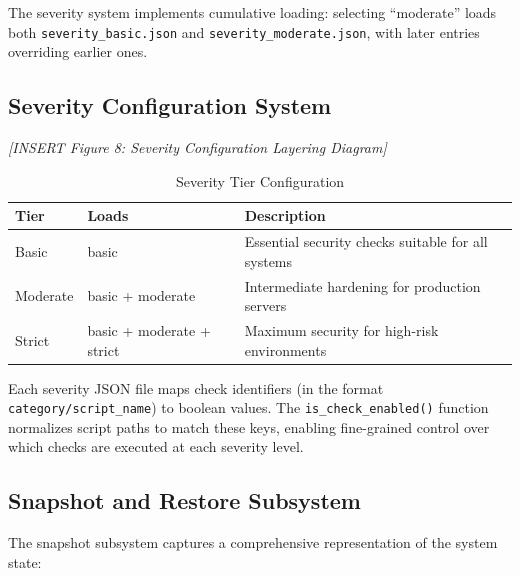 The severity system implements cumulative loading: selecting ``moderate'' loads both \texttt{severity\_basic.json} and \texttt{severity\_moderate.json}, with later entries overriding earlier ones.

\subsection{Severity Configuration System}

\vspace{0.5cm}
\noindent\textit{[INSERT Figure 8: Severity Configuration Layering Diagram]}
\vspace{0.5cm}

\begin{table}[H]
\centering
\caption{Severity Tier Configuration}
\begin{tabular}{|l|l|p{6cm}|}
\hline
\textbf{Tier} & \textbf{Loads} & \textbf{Description} \\
\hline
Basic & basic & Essential security checks suitable for all systems \\
\hline
Moderate & basic + moderate & Intermediate hardening for production servers \\
\hline
Strict & basic + moderate + strict & Maximum security for high-risk environments \\
\hline
\end{tabular}
\label{tab:severity}
\end{table}

Each severity JSON file maps check identifiers (in the format \texttt{category/script\_name}) to boolean values. The \texttt{is\_check\_enabled()} function normalizes script paths to match these keys, enabling fine-grained control over which checks are executed at each severity level.

\subsection{Snapshot and Restore Subsystem}

The snapshot subsystem captures a comprehensive representation of the system state:

